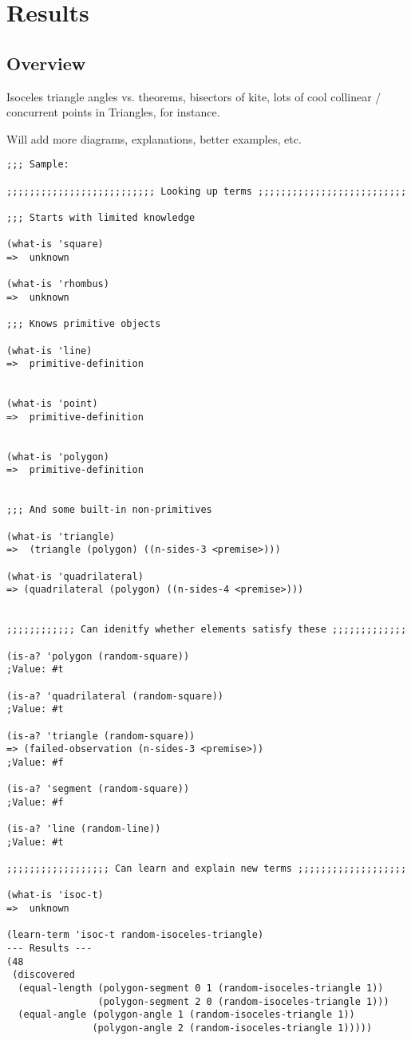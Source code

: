 \chapter{Results}
\label{chap:results}

\section{Overview}

Isoceles triangle angles vs. theorems, bisectors of kite, lots of cool
collinear / concurrent points in Triangles, for instance.

Will add more diagrams, explanations, better examples, etc.

\begin{verbatim}
;;; Sample:

;;;;;;;;;;;;;;;;;;;;;;;;;; Looking up terms ;;;;;;;;;;;;;;;;;;;;;;;;;;

;;; Starts with limited knowledge

(what-is 'square)
=>  unknown

(what-is 'rhombus)
=>  unknown

;;; Knows primitive objects

(what-is 'line)
=>  primitive-definition


(what-is 'point)
=>  primitive-definition


(what-is 'polygon)
=>  primitive-definition


;;; And some built-in non-primitives

(what-is 'triangle)
=>  (triangle (polygon) ((n-sides-3 <premise>)))

(what-is 'quadrilateral)
=> (quadrilateral (polygon) ((n-sides-4 <premise>)))


;;;;;;;;;;;; Can idenitfy whether elements satisfy these ;;;;;;;;;;;;;

(is-a? 'polygon (random-square))
;Value: #t

(is-a? 'quadrilateral (random-square))
;Value: #t

(is-a? 'triangle (random-square))
=> (failed-observation (n-sides-3 <premise>))
;Value: #f

(is-a? 'segment (random-square))
;Value: #f

(is-a? 'line (random-line))
;Value: #t

;;;;;;;;;;;;;;;;;; Can learn and explain new terms ;;;;;;;;;;;;;;;;;;;

(what-is 'isoc-t)
=>  unknown

(learn-term 'isoc-t random-isoceles-triangle)
--- Results ---
(48
 (discovered
  (equal-length (polygon-segment 0 1 (random-isoceles-triangle 1))
                (polygon-segment 2 0 (random-isoceles-triangle 1)))
  (equal-angle (polygon-angle 1 (random-isoceles-triangle 1))
               (polygon-angle 2 (random-isoceles-triangle 1)))))


\end{verbatim}
